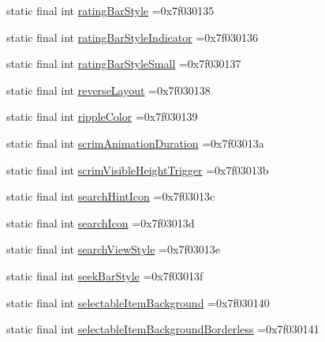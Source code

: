 \begin{DoxyCompactItemize}
\item 
static final int \mbox{\hyperlink{classcom_1_1example_1_1trainawearapplication_1_1_r_1_1attr_a34bafe392a36812de67d5c4b403f5940}{rating\+Bar\+Style}} =0x7f030135
\item 
static final int \mbox{\hyperlink{classcom_1_1example_1_1trainawearapplication_1_1_r_1_1attr_a99d57718cef432aaaa53833eaf2d058b}{rating\+Bar\+Style\+Indicator}} =0x7f030136
\item 
static final int \mbox{\hyperlink{classcom_1_1example_1_1trainawearapplication_1_1_r_1_1attr_a598a00e5f9f4ec2444c24e5072fe8bd4}{rating\+Bar\+Style\+Small}} =0x7f030137
\item 
static final int \mbox{\hyperlink{classcom_1_1example_1_1trainawearapplication_1_1_r_1_1attr_a258d6ac63a1763c177a66d833dc264ba}{reverse\+Layout}} =0x7f030138
\item 
static final int \mbox{\hyperlink{classcom_1_1example_1_1trainawearapplication_1_1_r_1_1attr_ae6841bc6f6df7ff2d82a9ce33347745c}{ripple\+Color}} =0x7f030139
\item 
static final int \mbox{\hyperlink{classcom_1_1example_1_1trainawearapplication_1_1_r_1_1attr_a38b74637a2ac4b4440002d246e97a35f}{scrim\+Animation\+Duration}} =0x7f03013a
\item 
static final int \mbox{\hyperlink{classcom_1_1example_1_1trainawearapplication_1_1_r_1_1attr_a07ad69347e048de70fa584d4a12af24c}{scrim\+Visible\+Height\+Trigger}} =0x7f03013b
\item 
static final int \mbox{\hyperlink{classcom_1_1example_1_1trainawearapplication_1_1_r_1_1attr_acedf5e07b00d287e7806dee9744b1452}{search\+Hint\+Icon}} =0x7f03013c
\item 
static final int \mbox{\hyperlink{classcom_1_1example_1_1trainawearapplication_1_1_r_1_1attr_ad089ba8a9c60f991fcac60162a9d1a8e}{search\+Icon}} =0x7f03013d
\item 
static final int \mbox{\hyperlink{classcom_1_1example_1_1trainawearapplication_1_1_r_1_1attr_a7a35c4fd6a280fc487a25c92428d07b3}{search\+View\+Style}} =0x7f03013e
\item 
static final int \mbox{\hyperlink{classcom_1_1example_1_1trainawearapplication_1_1_r_1_1attr_a76c1deb517935519b4e3563a87403b56}{seek\+Bar\+Style}} =0x7f03013f
\item 
static final int \mbox{\hyperlink{classcom_1_1example_1_1trainawearapplication_1_1_r_1_1attr_a7e87b948b75576f410ab8bea526c2fad}{selectable\+Item\+Background}} =0x7f030140
\item 
static final int \mbox{\hyperlink{classcom_1_1example_1_1trainawearapplication_1_1_r_1_1attr_a14ae67cda4335ccc08b7e2f3c11e8247}{selectable\+Item\+Background\+Borderless}} =0x7f030141

\end{DoxyCompactItemize}
